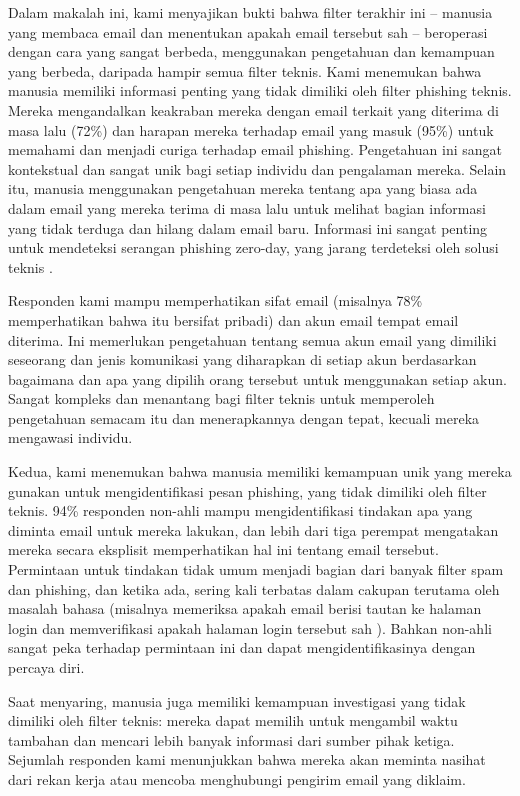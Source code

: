 \documentclass[lettersize,journal]{IEEEtran}
\begin{document}
Dalam makalah ini, kami menyajikan bukti bahwa filter terakhir ini – manusia
yang membaca email dan menentukan apakah email tersebut sah – beroperasi dengan
cara yang sangat berbeda, menggunakan pengetahuan dan kemampuan yang berbeda,
daripada hampir semua filter teknis. Kami menemukan bahwa manusia memiliki
informasi penting yang tidak dimiliki oleh filter phishing teknis. Mereka
mengandalkan keakraban mereka dengan email terkait yang diterima di masa lalu
(72\%) dan harapan mereka terhadap email yang masuk (95\%) untuk memahami dan
menjadi curiga terhadap email phishing. Pengetahuan ini sangat kontekstual dan
sangat unik bagi setiap individu dan pengalaman mereka. Selain itu, manusia
menggunakan pengetahuan mereka tentang apa yang biasa ada dalam email yang
mereka terima di masa lalu untuk melihat bagian informasi yang tidak terduga
dan hilang dalam email baru. Informasi ini sangat penting untuk mendeteksi
serangan phishing zero-day, yang jarang terdeteksi oleh solusi teknis
\cite{satudua}.

Responden kami mampu memperhatikan sifat email (misalnya 78\% memperhatikan
bahwa itu bersifat pribadi) dan akun email tempat email diterima. Ini
memerlukan pengetahuan tentang semua akun email yang dimiliki seseorang dan
jenis komunikasi yang diharapkan di setiap akun berdasarkan bagaimana dan apa
yang dipilih orang tersebut untuk menggunakan setiap akun. Sangat kompleks dan
menantang bagi filter teknis untuk memperoleh pengetahuan semacam itu dan
menerapkannya dengan tepat, kecuali mereka mengawasi individu.

Kedua, kami menemukan bahwa manusia memiliki kemampuan unik yang mereka gunakan
untuk mengidentifikasi pesan phishing, yang tidak dimiliki oleh filter teknis.
94\% responden non-ahli mampu mengidentifikasi tindakan apa yang diminta email
untuk mereka lakukan, dan lebih dari tiga perempat mengatakan mereka secara
eksplisit memperhatikan hal ini tentang email tersebut. Permintaan untuk
tindakan tidak umum menjadi bagian dari banyak filter spam dan phishing, dan
ketika ada, sering kali terbatas dalam cakupan terutama oleh masalah bahasa
(misalnya memeriksa apakah email berisi tautan ke halaman login dan
memverifikasi apakah halaman login tersebut sah \cite{duatiga}). Bahkan
non-ahli sangat peka terhadap permintaan ini dan dapat mengidentifikasinya
dengan percaya diri.

Saat menyaring, manusia juga memiliki kemampuan investigasi yang tidak dimiliki
oleh filter teknis: mereka dapat memilih untuk mengambil waktu tambahan dan
mencari lebih banyak informasi dari sumber pihak ketiga. Sejumlah responden
kami menunjukkan bahwa mereka akan meminta nasihat dari rekan kerja atau
mencoba menghubungi pengirim email yang diklaim.
\end{document}
